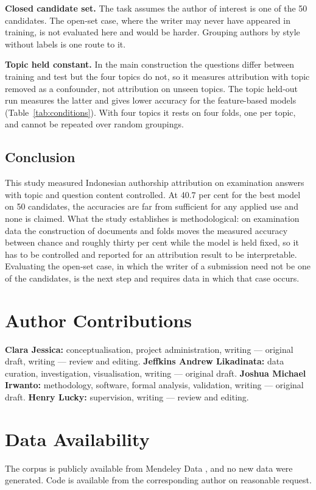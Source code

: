 \documentclass[conference]{IEEEtran}
\begin{document}
\textbf{Closed candidate set.} The task assumes the author of interest is one of the 50 candidates. The open-set case, where the writer may never have appeared in training, is not evaluated here and would be harder. Grouping authors by style without labels \cite{Bertocco2023} is one route to it.

\textbf{Topic held constant.} In the main construction the questions differ between training and test but the four topics do not, so it measures attribution with topic removed as a confounder, not attribution on unseen topics. The topic held-out run measures the latter \cite{Altakrori2021,Barlas2021} and gives lower accuracy for the feature-based models (Table~\ref{tab:conditions}). With four topics it rests on four folds, one per topic, and cannot be repeated over random groupings.

\subsection{Conclusion}

This study measured Indonesian authorship attribution on examination answers with topic and question content controlled. At 40.7 per cent for the best model on 50 candidates, the accuracies are far from sufficient for any applied use and none is claimed. What the study establishes is methodological: on examination data the construction of documents and folds moves the measured accuracy between chance and roughly thirty per cent while the model is held fixed, so it has to be controlled and reported for an attribution result to be interpretable. Evaluating the open-set case, in which the writer of a submission need not be one of the candidates, is the next step and requires data in which that case occurs.

\section*{Author Contributions}
\textbf{Clara Jessica:} conceptualisation, project administration, writing --- original draft, writing --- review and editing.
\textbf{Jeffkins Andrew Likadinata:} data curation, investigation, visualisation, writing --- original draft.
\textbf{Joshua Michael Irwanto:} methodology, software, formal analysis, validation, writing --- original draft.
\textbf{Henry Lucky:} supervision, writing --- review and editing.

\section*{Data Availability}
The corpus is publicly available from Mendeley Data \cite{Rahutomo2018}, and no new data were generated. Code is available from the corresponding author on reasonable request.
\end{document}
